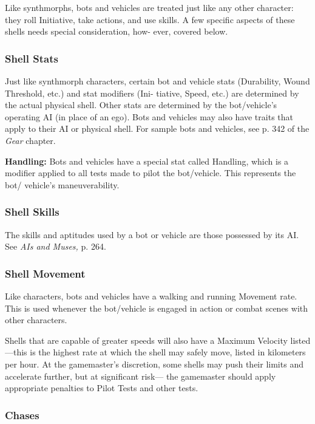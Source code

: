 Like synthmorphs, bots and vehicles 
are treated just like any other character: 
they roll Initiative, take actions, and use 
skills. A few specific aspects of these 
shells needs special consideration, how-
ever, covered below.

\subsubsection{Shell Stats}

Just like synthmorph characters, certain 
bot and vehicle stats (Durability, Wound 
Threshold, etc.) and stat modifiers  (Ini-
tiative, Speed, etc.) are determined by 
the actual physical shell. Other stats are 
determined by the bot/vehicle's operating 
AI (in place of an ego). Bots and vehicles 
may also have traits that apply to their 
AI or physical shell. For sample bots and 
vehicles, see p. 342 of the \textit{Gear} chapter.

\textbf{Handling:} Bots and vehicles have a 
special stat called Handling, which is a 
modifier applied to all tests made to pilot 
the bot/vehicle. This represents the bot/
vehicle's maneuverability.

\subsubsection{Shell Skills}

The skills and aptitudes used by a bot or 
vehicle are those possessed by its AI. See 
\textit{AIs and Muses,} p. 264.

\subsubsection{Shell Movement}

Like characters, bots and vehicles have 
a walking and running Movement rate. 
This is used whenever the bot/vehicle is 
engaged in action or combat scenes with 
other characters.

Shells that are capable of greater speeds 
will also have a Maximum Velocity 
listed—this is the highest rate at which the 
shell may safely move, listed in kilometers 
per hour. At the gamemaster's discretion, 
some shells may push their limits and 
accelerate further, but at significant risk—
the gamemaster should apply appropriate 
penalties to Pilot Tests and other tests.

\subsubsection{Chases}

